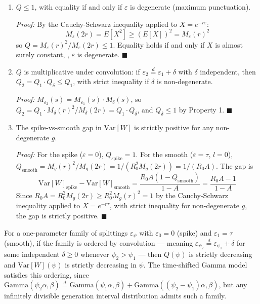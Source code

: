 \begin{enumerate}
	\item $Q \leq 1$, with equality if and only if $\varepsilon$ is degenerate (maximum punctuation).

	{\it Proof:} By the Cauchy-Schwarz inequality applied to $X = e^{-r\varepsilon}$:
	\[M_\varepsilon(2r) = E[X^2] \geq (E[X])^2 = M_\varepsilon(r)^2\]
	so $Q = M_\varepsilon(r)^2 / M_\varepsilon(2r) \leq 1$. Equality holds if and only if $X$ is almost surely constant, \ie, $\varepsilon$ is degenerate. $\blacksquare$

	\item $Q$ is multiplicative under convolution: if $\varepsilon_2 \overset{d}{=} \varepsilon_1 + \delta$ with $\delta$ independent, then $Q_2 = Q_1 \cdot Q_\delta \leq Q_1$, with strict inequality if $\delta$ is non-degenerate.

	{\it Proof:} $M_{\varepsilon_2}(s) = M_{\varepsilon_1}(s) \cdot M_\delta(s)$, so $Q_2 = Q_1 \cdot M_\delta(r)^2 / M_\delta(2r) = Q_1 \cdot Q_\delta$, and $Q_\delta \leq 1$ by Property 1. $\blacksquare$

	\item The spike-vs-smooth gap in $\text{Var}[W]$ is strictly positive for any non-degenerate $g$.

	{\it Proof:} For the spike ($\varepsilon = 0$), $Q_\text{spike} = 1$. For the smooth ($\varepsilon = \tau$, $l = 0$), $Q_\text{smooth} = M_g(r)^2 / M_g(2r) = 1 / (R_0^2 M_g(2r)) = 1/(R_0 A)$. The gap is
	\[
	\text{Var}[W]_\text{spike} - \text{Var}[W]_\text{smooth} = \frac{R_0 A (1 - Q_\text{smooth})}{1 - A} = \frac{R_0 A - 1}{1 - A}
	\]
	Since $R_0 A = R_0^2 M_g(2r) \geq R_0^2 M_g(r)^2 = 1$ by the Cauchy-Schwarz inequality applied to $X = e^{-r\tau}$, with strict inequality for non-degenerate $g$, the gap is strictly positive. $\blacksquare$
\end{enumerate}

 For a one-parameter family of splittings $\varepsilon_\psi$ with $\varepsilon_0 = 0$ (spike) and $\varepsilon_1 = \tau$ (smooth), if the family is ordered by convolution --- meaning $\varepsilon_{\psi_2} \overset{d}{=} \varepsilon_{\psi_1} + \delta$ for some independent $\delta \geq 0$ whenever $\psi_2 > \psi_1$ --- then $Q(\psi)$ is strictly decreasing and $\text{Var}[W](\psi)$ is strictly decreasing in $\psi$. The time-shifted Gamma model satisfies this ordering, since $\text{Gamma}(\psi_2 \alpha, \beta) \overset{d}{=} \text{Gamma}(\psi_1 \alpha, \beta) + \text{Gamma}((\psi_2 - \psi_1) \alpha, \beta)$, but any infinitely divisible generation interval distribution admits such a family.

